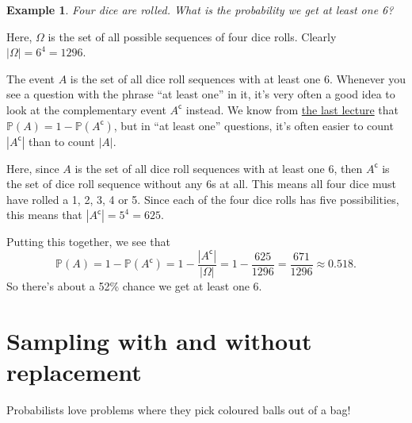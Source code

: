 \documentclass[
  a4paper,
]{book}
\theoremstyle{definition}
\theoremstyle{definition}
\newtheorem{example}{Example}[chapter]
\theoremstyle{definition}
\theoremstyle{definition}
\theoremstyle{remark}
\begin{document}
\begin{example}
\emph{Four dice are rolled. What is the probability we get at least one 6?}

Here, \(\Omega\) is the set of all possible sequences of four dice rolls. Clearly \(|\Omega| = 6^4 = 1296\).

The event \(A\) is the set of all dice roll sequences with at least one 6. Whenever you see a question with the phrase ``at least one'' in it, it's very often a good idea to look at the complementary event \(A^\mathsf{c}\) instead. We know from \protect\hyperlink{prob-properties}{the last lecture} that \(\mathbb P(A) = 1 - \mathbb P(A^\mathsf{c})\), but in ``at least one'' questions, it's often easier to count \(|A^\mathsf{c}|\) than to count \(|A|\).

Here, since \(A\) is the set of all dice roll sequences with at least one 6, then \(A^\mathsf{c}\) is the set of dice roll sequence without any 6s at all. This means all four dice must have rolled a 1, 2, 3, 4 or 5. Since each of the four dice rolls has five possibilities, this means that \(|A^\mathsf{c}| = 5^4 = 625\).

Putting this together, we see that
\[ \mathbb P(A) = 1 - \mathbb P(A^\mathsf{c}) = 1 - \frac{|A^\mathsf{c}|}{|\Omega|} = 1 - \frac{625}{1296} = \frac{671}{1296} \approx 0.518 .\]
So there's about a 52\% chance we get at least one 6.
\end{example}

\hypertarget{sampling}{%
\section{Sampling with and without replacement}\label{sampling}}

Probabilists love problems where they pick coloured balls out of a bag!
\end{document}
